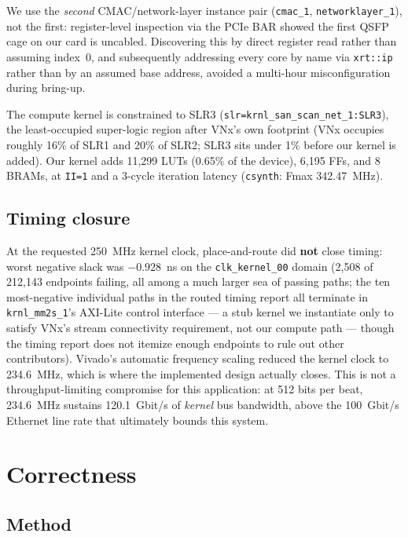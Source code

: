 \documentclass[11pt,a4paper]{article}
\newcommand{\code}[1]{\texttt{#1}}
\begin{document}
We use the \emph{second} CMAC/network-layer instance pair
(\code{cmac\_1}, \code{networklayer\_1}), not the first: register-level
inspection via the PCIe BAR showed the first QSFP cage on our card is
uncabled. Discovering this by direct register read rather than assuming
index~0, and subsequently addressing every core by name via
\code{xrt::ip} rather than by an assumed base address, avoided a
multi-hour misconfiguration during bring-up.

The compute kernel is constrained to SLR3
(\code{slr=krnl\_san\_scan\_net\_1:SLR3}), the least-occupied
super-logic region after VNx's own footprint (VNx occupies roughly 16\%
of SLR1 and 20\% of SLR2; SLR3 sits under 1\% before our kernel is
added). Our kernel adds 11{,}299 LUTs (0.65\% of the device), 6{,}195
FFs, and 8 BRAMs, at \code{II=1} and a 3-cycle iteration latency
(\code{csynth}: Fmax 342.47~MHz).

\subsection{Timing closure}

At the requested 250~MHz kernel clock, place-and-route did \textbf{not}
close timing: worst negative slack was $-0.928$~ns on the
\code{clk\_kernel\_00} domain (2{,}508 of 212{,}143 endpoints failing,
all among a much larger sea of passing paths; the ten most-negative
individual paths in the routed timing report all terminate in
\code{krnl\_mm2s\_1}'s AXI-Lite control interface --- a stub kernel we
instantiate only to satisfy VNx's stream connectivity requirement, not
our compute path --- though the timing report does not itemize enough
endpoints to rule out other contributors). Vivado's automatic frequency
scaling reduced the kernel clock to 234.6~MHz, which is where the
implemented design actually closes. This is not a throughput-limiting
compromise for this application: at 512 bits per beat, 234.6~MHz
sustains 120.1~Gbit/s of \emph{kernel} bus bandwidth, above the
100~Gbit/s Ethernet line rate that ultimately bounds this system.

\section{Correctness}
\label{sec:correctness}

\subsection{Method}
\end{document}
